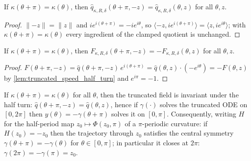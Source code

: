 \begin{lemma}
  \label{lem:truncated_speed_half_turn}
  If $\kappa(\theta+\pi)=\kappa(\theta)$, then
  $\hat q_{\kappa,R,\delta}(\theta+\pi,-z)=\hat q_{\kappa,R,\delta}(\theta,z)$ for all
  $\theta,z$.
\end{lemma}

\begin{proof}

\leanok
  $\|{-z}\|=\|z\|$ and $ie^{i(\theta+\pi)}=-ie^{i\theta}$, so
  $\langle -z,ie^{i(\theta+\pi)}\rangle=\langle z,ie^{i\theta}\rangle$; with
  $\kappa(\theta+\pi)=\kappa(\theta)$ every ingredient of the clamped quotient is
  unchanged.
\end{proof}

\begin{lemma}
  \label{lem:truncated_field_half_turn}
  If $\kappa(\theta+\pi)=\kappa(\theta)$, then
  $F_{\kappa,R,\delta}(\theta+\pi,-z)=-F_{\kappa,R,\delta}(\theta,z)$ for all
  $\theta,z$.
\end{lemma}

\begin{proof}

\leanok
  $F(\theta+\pi,-z)=\hat q(\theta+\pi,-z)\,e^{i(\theta+\pi)}
   =\hat q(\theta,z)\cdot(-e^{i\theta})=-F(\theta,z)$ by
  \cref{lem:truncated_speed_half_turn} and $e^{i\pi}=-1$.
\end{proof}

\begin{lemma}

  \label{lem:flow_half_turn_equivariance}
  If $\kappa(\theta+\pi)=\kappa(\theta)$ for all $\theta$, then the truncated field is
  invariant under the half turn: $\hat q(\theta+\pi,-z)=\hat q(\theta,z)$, hence if
  $\gamma(\cdot)$ solves the truncated ODE on $[0,2\pi]$ then $y(\theta)=-\gamma(\theta+\pi)$
  solves it on $[0,\pi]$. Consequently, writing $H$ for the half-period map
  $z_0\mapsto\Phi(z_0,\pi)$ of a $\pi$-periodic curvature: if $H(z_0)=-z_0$ then the
  trajectory through $z_0$ satisfies the central symmetry $\gamma(\theta+\pi)=-\gamma(\theta)$ for
  $\theta\in[0,\pi]$; in particular it closes at $2\pi$: $\gamma(2\pi)=-\gamma(\pi)=z_0$.
\end{lemma}

